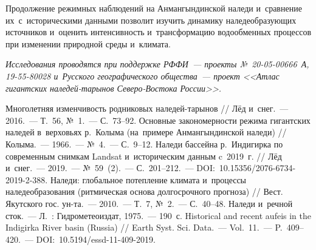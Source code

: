 Продолжение режимных наблюдений на Анмангындинской наледи и~сравнение их~с~историческими данными позволит изучить динамику наледеобразующих источников и~оценить интенсивность и~трансформацию водообменных процессов при изменении природной среды и~климата.

\textit{Исследования проводятся при поддержке РФФИ~--- проекты №~20-05-00666~А, 19-55-80028 и~Русского географического общества~--- проект <<Атлас гигантских наледей-тарынов Северо-Востока России>>.}

\begin{thebibliography}{99}
\bibitem{} Многолетняя изменчивость родниковых наледей-тарынов // Лёд и~снег.~--- 2016.~--- Т.~56, №~1.~--- С.~73--92.
\bibitem{} Основные закономерности режима гигантских наледей в~верховьях р.~Колыма (на~примере Анмангындинской наледи) // Колыма.~--- 1966.~--- №~4.~--- С.~9--12.
\bibitem{} Наледи бассейна р.~Индигирка по современным снимкам Landsat и~историческим данным c~2019~г. // Лёд и~снег.~--- 2019.~--- №~59~(2).~--- С.~201--212.~--- DOI:~10.15356/2076-6734-2019-2-388.
\bibitem{} Наледи: глобальное потепление климата и~процессы наледеобразования (ритмическая основа долгосрочного прогноза) // Вест. Якутского гос. ун-та.~--- 2010.~--- Т.~7, №~2.~--- С.~40--48.
\bibitem{} Наледи и~речной сток.~--- Л.~: Гидрометеоиздат, 1975.~--- 190~с.
\bibitem{} Historical and recent aufeis in the Indigirka River basin (Russia) // Earth Syst. Sci. Data.~--- Vol.~11.~--- P.~409--420.~--- DOI:~10.5194/essd-11-409-2019.
\end{thebibliography}
